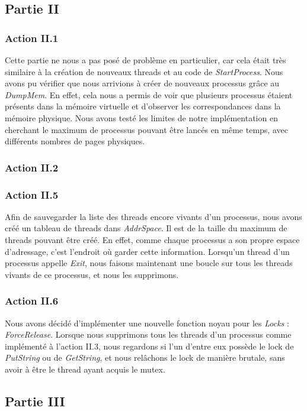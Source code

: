 \documentclass{article}
\begin{document}
\subsection{Partie II}

\subsubsection{Action II.1}
Cette partie ne nous a pas posé de problème en particulier, car cela était très similaire à la création 
de nouveaux threads et au code de \textit{StartProcess}. Nous avons pu vérifier que nous
arrivions à créer de nouveaux processus grâce au \textit{DumpMem}. En effet, cela nous a permis
de voir que plusieurs processus étaient présents dans la mémoire virtuelle et d'observer les
correspondances dans la mémoire physique. Nous avons testé les limites de notre implémentation
en cherchant le maximum de processus pouvant être lancés en même temps, avec différents nombres
de pages physiques.

\subsubsection{Action II.2}

\subsubsection{Action II.5}
Afin de sauvegarder la liste des threads encore vivants d'un processus, nous avons créé un tableau de threads dans \textit{AddrSpace}.
Il est de la taille du maximum de threads pouvant être créé. En effet, comme chaque processus a son propre espace d'adressage, c'est l'endroit
où garder cette information. Lorsqu'un thread d'un processus appelle \textit{Exit}, nous faisons maintenant une boucle sur tous les threads vivants
de ce processus, et nous les supprimons.

\subsubsection{Action II.6}
Nous avons décidé d'implémenter une nouvelle fonction noyau pour les \textit{Locks} : \textit{ForceRelease}. Lorsque nous supprimons tous les threads
d'un processus comme implémenté à l'action II.3, nous regardons si l'un d'entre eux possède le lock de \textit{PutString} ou  de \textit{GetString},
et nous relâchons le lock de manière brutale, sans avoir à être le thread ayant acquis le mutex.

\subsection{Partie III}
\end{document}
